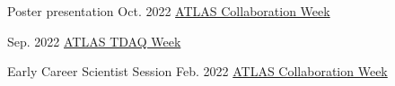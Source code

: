 \begin{cventries}
    {Poster presentation}
    {Oct. 2022}
    {\href{https://indico.cern.ch/event/1187086/\#37-the-atlas-jet-trigger-in-ru}{ATLAS Collaboration Week}}
    {}\vspace*{2mm}

    {}
    {Sep. 2022}
    {\href{https://indico.cern.ch/event/1172448/contributions/4924082/}{ATLAS TDAQ Week}}
    {}\vspace*{2mm}

    {Early Career Scientist Session}
    {Feb. 2022}
    {\href{https://indico.cern.ch/event/1108354/\#167-readiness-of-the-jet-trigg}{ATLAS Collaboration Week}}{}

    

\end{cventries}
